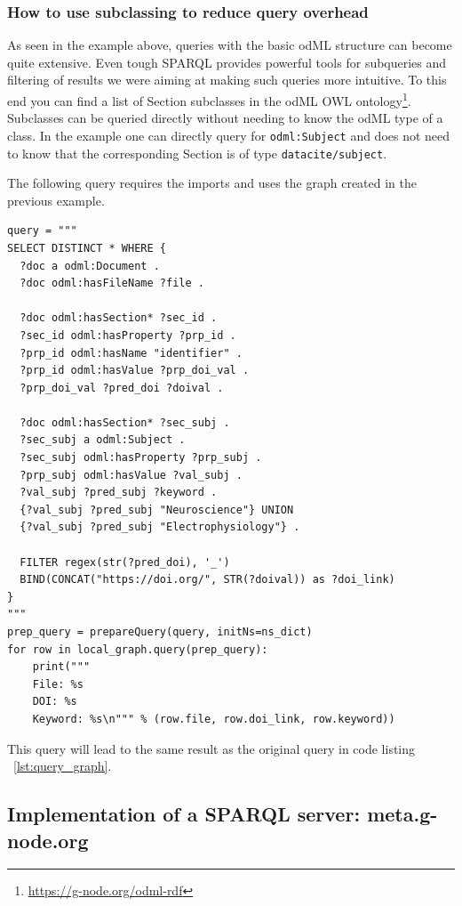\documentclass{article}
\begin{document}
\subsubsection{How to use subclassing to reduce query overhead} \label{sec:rdf_subclass_usage}

As seen in the example above, queries with the basic odML structure can become quite extensive. Even tough SPARQL provides powerful tools for subqueries and filtering of results we were aiming at making such queries more intuitive. To this end you can find a list of Section subclasses in the odML OWL ontology\footnote{\url{https://g-node.org/odml-rdf}}. Subclasses can be queried directly without needing to know the odML type of a class. In the example one can directly query for \texttt{odml:Subject} and does not need to know that the corresponding Section is of type \texttt{datacite/subject}.

The following query requires the imports and uses the graph created in the previous example.

\begin{lstlisting}[label=lst:query_graph_subclass, caption=Subclass query example, basicstyle=\small]
query = """
SELECT DISTINCT * WHERE {
  ?doc a odml:Document .
  ?doc odml:hasFileName ?file .

  ?doc odml:hasSection* ?sec_id .
  ?sec_id odml:hasProperty ?prp_id .
  ?prp_id odml:hasName "identifier" .
  ?prp_id odml:hasValue ?prp_doi_val .
  ?prp_doi_val ?pred_doi ?doival .

  ?doc odml:hasSection* ?sec_subj .
  ?sec_subj a odml:Subject .
  ?sec_subj odml:hasProperty ?prp_subj .
  ?prp_subj odml:hasValue ?val_subj .
  ?val_subj ?pred_subj ?keyword .
  {?val_subj ?pred_subj "Neuroscience"} UNION
  {?val_subj ?pred_subj "Electrophysiology"} .

  FILTER regex(str(?pred_doi), '_')
  BIND(CONCAT("https://doi.org/", STR(?doival)) as ?doi_link)
}
"""
prep_query = prepareQuery(query, initNs=ns_dict)
for row in local_graph.query(prep_query):
    print("""
    File: %s
    DOI: %s
    Keyword: %s\n""" % (row.file, row.doi_link, row.keyword))
\end{lstlisting}

This query will lead to the same result as the original query in code listing ~\ref{lst:query_graph}.

\subsection{Implementation of a SPARQL server: meta.g-node.org} \label{sec:odml_query}
\end{document}
